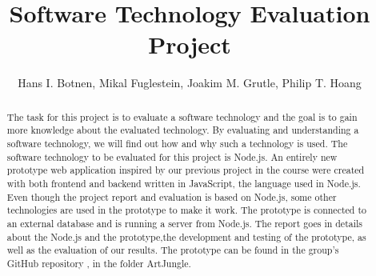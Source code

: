 \documentclass[11pt]{article}
\begin{document}
\title{Software Technology Evaluation Project}

\author{Hans I. Botnen, Mikal Fuglestein, Joakim M. Grutle, Philip T. Hoang}

\maketitle

\begin{abstract}
    The task for this project is to evaluate a software technology and the goal is to gain more knowledge about the evaluated technology. By evaluating and understanding a software technology, we will find out how and why such a technology is used. The software technology to be evaluated for this project is Node.js. An entirely new prototype web application inspired by our previous project in the course were created with both frontend and backend written in JavaScript, the language used in Node.js. Even though the project report and evaluation is based on Node.js, some other technologies are used in the prototype to make it work. The prototype is connected to an external database and is running a server from Node.js. The report goes in details about the Node.js and the prototype,the development and testing of the prototype, as well as the evaluation of our results. The prototype can be found in the group's GitHub repository \cite{prototype:repo}, in the folder ArtJungle.
\end{abstract}
\clearpage
\clearpage

\clearpage




\clearpage


\end{document}
